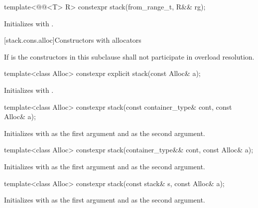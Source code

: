%
\begin{itemdecl}
template<@@<T> R>
  constexpr stack(from_range_t, R&& rg);
\end{itemdecl}

\begin{itemdescr}
\pnum
\effects
Initializes  with .
\end{itemdescr}

[stack.cons.alloc]{Constructors with allocators}

\pnum
If  is 
the constructors in this subclause shall not participate in overload resolution.

%
\begin{itemdecl}
template<class Alloc> constexpr explicit stack(const Alloc& a);
\end{itemdecl}

\begin{itemdescr}
\pnum
\effects
Initializes  with .
\end{itemdescr}

%
\begin{itemdecl}
template<class Alloc> constexpr stack(const container_type& cont, const Alloc& a);
\end{itemdecl}

\begin{itemdescr}
\pnum
\effects
Initializes  with  as the first argument and  as the
second argument.
\end{itemdescr}

%
\begin{itemdecl}
template<class Alloc> constexpr stack(container_type&& cont, const Alloc& a);
\end{itemdecl}

\begin{itemdescr}
\pnum
\effects
Initializes  with  as the first argument and 
as the second argument.
\end{itemdescr}

%
\begin{itemdecl}
template<class Alloc> constexpr stack(const stack& s, const Alloc& a);
\end{itemdecl}

\begin{itemdescr}
\pnum
\effects
Initializes  with  as the first argument and 
as the second argument.
\end{itemdescr}

